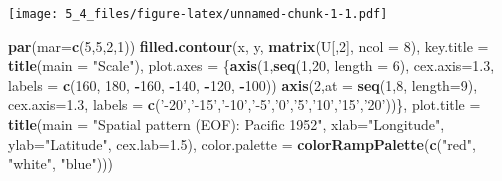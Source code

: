 \documentclass[]{article}
\newenvironment{Shaded}{\begin{snugshade}}{\end{snugshade}}
\newcommand{\KeywordTok}[1]{\textcolor[rgb]{0.13,0.29,0.53}{\textbf{#1}}}
\newcommand{\DataTypeTok}[1]{\textcolor[rgb]{0.13,0.29,0.53}{#1}}
\newcommand{\DecValTok}[1]{\textcolor[rgb]{0.00,0.00,0.81}{#1}}
\newcommand{\FloatTok}[1]{\textcolor[rgb]{0.00,0.00,0.81}{#1}}
\newcommand{\StringTok}[1]{\textcolor[rgb]{0.31,0.60,0.02}{#1}}
\newcommand{\OperatorTok}[1]{\textcolor[rgb]{0.81,0.36,0.00}{\textbf{#1}}}
\newcommand{\NormalTok}[1]{#1}
\begin{document}
\texttt{[image: 5\_4\_files/figure-latex/unnamed-chunk-1-1.pdf]}

\begin{Shaded}
\begin{Highlighting}[]
\KeywordTok{par}\NormalTok{(}\DataTypeTok{mar=}\KeywordTok{c}\NormalTok{(}\DecValTok{5}\NormalTok{,}\DecValTok{5}\NormalTok{,}\DecValTok{2}\NormalTok{,}\DecValTok{1}\NormalTok{))}
\KeywordTok{filled.contour}\NormalTok{(x, y, }\KeywordTok{matrix}\NormalTok{(U[,}\DecValTok{2}\NormalTok{], }\DataTypeTok{ncol =} \DecValTok{8}\NormalTok{), }
               \DataTypeTok{key.title =} \KeywordTok{title}\NormalTok{(}\DataTypeTok{main =} \StringTok{"Scale"}\NormalTok{),}
               \DataTypeTok{plot.axes =}\NormalTok{  \{}\KeywordTok{axis}\NormalTok{(}\DecValTok{1}\NormalTok{,}\KeywordTok{seq}\NormalTok{(}\DecValTok{1}\NormalTok{,}\DecValTok{20}\NormalTok{, }\DataTypeTok{length =} \DecValTok{6}\NormalTok{), }\DataTypeTok{cex.axis=}\FloatTok{1.3}\NormalTok{, }\DataTypeTok{labels =} \KeywordTok{c}\NormalTok{(}\DecValTok{160}\NormalTok{, }\DecValTok{180}\NormalTok{, }\OperatorTok{-}\DecValTok{160}\NormalTok{, }\OperatorTok{-}\DecValTok{140}\NormalTok{, }\OperatorTok{-}\DecValTok{120}\NormalTok{, }\OperatorTok{-}\DecValTok{100}\NormalTok{))  }
                 \KeywordTok{axis}\NormalTok{(}\DecValTok{2}\NormalTok{,}\DataTypeTok{at =} \KeywordTok{seq}\NormalTok{(}\DecValTok{1}\NormalTok{,}\DecValTok{8}\NormalTok{, }\DataTypeTok{length=}\DecValTok{9}\NormalTok{), }\DataTypeTok{cex.axis=}\FloatTok{1.3}\NormalTok{, }\DataTypeTok{labels =} \KeywordTok{c}\NormalTok{(}\StringTok{'-20'}\NormalTok{,}\StringTok{'-15'}\NormalTok{,}\StringTok{'-10'}\NormalTok{,}\StringTok{'-5'}\NormalTok{,}\StringTok{'0'}\NormalTok{,}\StringTok{'5'}\NormalTok{,}\StringTok{'10'}\NormalTok{,}\StringTok{'15'}\NormalTok{,}\StringTok{'20'}\NormalTok{))\},}
               \DataTypeTok{plot.title =} \KeywordTok{title}\NormalTok{(}\DataTypeTok{main =} \StringTok{"Spatial pattern (EOF): Pacific 1952"}\NormalTok{,}
                                  \DataTypeTok{xlab=}\StringTok{"Longitude"}\NormalTok{,}
                                  \DataTypeTok{ylab=}\StringTok{"Latitude"}\NormalTok{, }\DataTypeTok{cex.lab=}\FloatTok{1.5}\NormalTok{),}
               \DataTypeTok{color.palette =} \KeywordTok{colorRampPalette}\NormalTok{(}\KeywordTok{c}\NormalTok{(}\StringTok{"red"}\NormalTok{, }\StringTok{"white"}\NormalTok{, }\StringTok{"blue"}\NormalTok{)))}
\end{Highlighting}
\end{Shaded}
\end{document}
